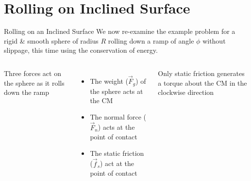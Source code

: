 \documentclass[12pt,compress,aspectratio=169]{beamer}
\begin{document}
%
%  
%
%
%
%
%  
%
%  



\section{Rolling on Inclined Surface}

\begin{frame}{Rolling on an Inclined Surface}
  We now re-examine the example problem for a rigid \& smooth sphere of radius
  $R$ rolling down a ramp of angle  $\phi$ without slippage, this time using
  the conservation of energy.

  \vspace{.2in}
  \begin{columns}
    

    Three forces act on the sphere as it rolls down the ramp
    \begin{itemize}
    \item The weight ($\vec F_g$) of the sphere acts at the CM
    \item The normal force ($\vec F_n$) acts at the point of contact
    \item The static friction ($\vec f_s$) act at the point of contact
    \end{itemize}
    Only static friction generates a torque about the CM in the clockwise
    direction
  \end{columns}
\end{frame}
\end{document}
